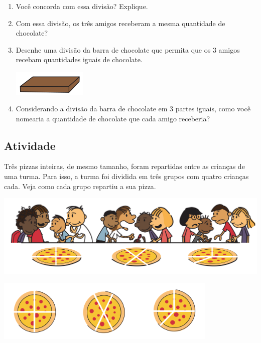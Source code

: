 \begin{enumerate} [\quad a)] %
  \item Você concorda com essa divisão? Explique.
  \item Com essa divisão, os três amigos receberam a mesma quantidade de chocolate?
  \item Desenhe uma divisão da barra de chocolate que permita que os 3 amigos recebam quantidades iguais de chocolate.
    \begin{center}
    \includegraphics[width=100pt, keepaspectratio]{../figuras/licao01/ativ1_fig02a.png}
  \end{center}
  \item Considerando a divisão da barra de chocolate em 3 partes iguais, como você nomearia a quantidade de chocolate que cada amigo receberia?
\end{enumerate} %

\subsection{Atividade}
Três pizzas inteiras, de mesmo tamanho, foram repartidas entre as crianças de uma turma. Para isso, a turma foi dividida em três grupos com quatro crianças cada. Veja como cada grupo repartiu a sua pizza.

  \begin{center}
    \includegraphics[width=400pt, keepaspectratio]{../figuras/licao01/ativ2_fig01.png}

    \includegraphics[width=300pt, keepaspectratio]{../figuras/licao01/ativ2_fig02.png}
  \end{center}

